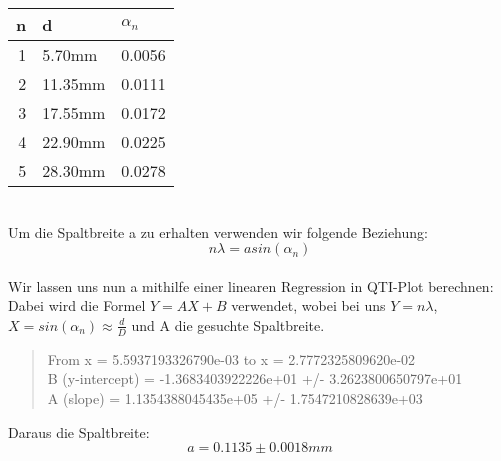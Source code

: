 \documentclass{article}
\begin{document}
\begin{tabular}{|r|l|l|}
\hline
n & d & $\alpha_n$\\
\hline
1 & 5.70mm & 0.0056\\
2 & 11.35mm & 0.0111\\
3 & 17.55mm & 0.0172\\
4 & 22.90mm & 0.0225\\
5 & 28.30mm & 0.0278\\
\hline
\end{tabular}
\vspace{0.8cm}
\\Um die Spaltbreite a zu erhalten verwenden wir folgende Beziehung:
$$n\lambda=a sin(\alpha_n)$$\\
Wir lassen uns nun a mithilfe einer linearen Regression in QTI-Plot berechnen:\\
Dabei wird die Formel $Y=AX+B$ verwendet, wobei bei uns $Y=n\lambda$, $X=sin(\alpha_n)\approx\frac{d}{D}$ und A die gesuchte Spaltbreite.\\

\begin{quote}
From x = 5.5937193326790e-03 to x = 2.7772325809620e-02\\
B (y-intercept) = -1.3683403922226e+01 +/- 3.2623800650797e+01\\
A (slope) = 1.1354388045435e+05 +/- 1.7547210828639e+03\\
\end{quote}

Daraus die Spaltbreite: 
$$\boxed{a=0.1135 \pm 0.0018mm}$$\\
\end{document}
